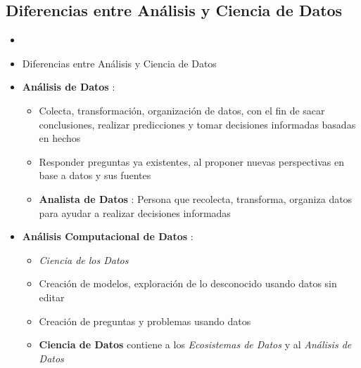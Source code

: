 \subsection{Diferencias entre Análisis y Ciencia de Datos}
\begin{itemize}
    \item 
\end{itemize}
\begin{itemize}
    \item {Diferencias entre Análisis y Ciencia de Datos}
    \item {\textbf{Análisis de Datos} : 
    \begin{itemize}
        \item {Colecta, transformación, organización de datos, con el fin de sacar conclusiones, realizar predicciones y tomar decisiones informadas basadas en hechos}
        \item {Responder preguntas ya existentes, al proponer nuevas perspectivas en base a datos y sus fuentes}
        \item {\textbf{Analista de Datos} : Persona que recolecta, transforma, organiza datos para ayudar a realizar decisiones informadas}
    \end{itemize}}
    \item {\textbf{Análisis Computacional de Datos} : 
    \begin{itemize}
        \item {\textit{Ciencia de los Datos}}
        \item {Creación de modelos, exploración de lo desconocido usando datos sin editar}
        \item {Creación de preguntas y problemas usando datos}
        \item {\textbf{Ciencia de Datos} contiene a los \textit{Ecosistemas de Datos} y al \textit{Análisis de Datos}}
    \end{itemize}}
\end{itemize}

\newpage